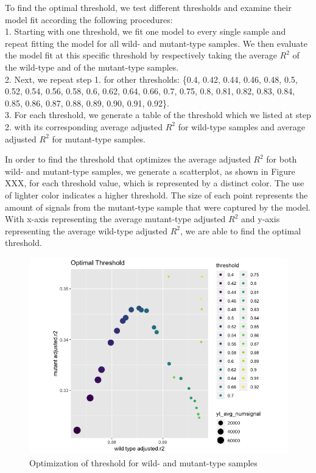 \documentclass[10pt,letterpaper]{article}
\begin{document}
To find the optimal threshold, we test different thresholds and examine
their model fit according the following procedures:\\
1. Starting with one threshold, we fit one model to every single sample
and repeat fitting the model for all wild- and mutant-type samples. We
then evaluate the model fit at this specific threshold by respectively
taking the average \(R^2\) of the wild-type and of the mutant-type
samples.\\
2. Next, we repeat step 1. for other thresholds: \{0.4, 0.42, 0.44,
0.46, 0.48, 0.5, 0.52, 0.54, 0.56, 0.58, 0.6, 0.62, 0.64, 0.66, 0.7,
0.75, 0.8, 0.81, 0.82, 0.83, 0.84, 0.85, 0.86, 0.87, 0.88, 0.89, 0.90,
0.91, 0.92\}.\\
3. For each threshold, we generate a table of the threshold which we
listed at step 2. with its corresponding average adjusted \(R^2\) for
wild-type samples and average adjusted \(R^2\) for mutant-type samples.

In order to find the threshold that optimizes the average adjusted
\(R^2\) for both wild- and mutant-type samples, we generate a
scatterplot, as shown in Figure XXX, for each threshold value, which is
represented by a distinct color. The use of lighter color indicates a
higher threshold. The size of each point represents the amount of
signals from the mutant-type sample that were captured by the model.
With x-axis representing the average mutant-type adjusted \(R^2\) and
y-axis representing the average wild-type adjusted \(R^2\), we are able
to find the optimal threshold.

\begin{figure}[H]
\includegraphics[width=0.9\linewidth]{visualization_paper/optimal_threshold2} \caption{Optimization of threshold for wild- and mutant-type samples}\label{fig:Figure2}
\end{figure}
\end{document}
